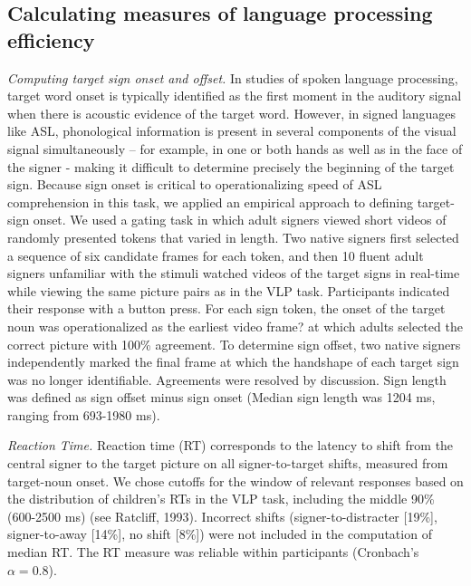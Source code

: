 \documentclass[oneside]{report}
\begin{document}
\subsection{Calculating measures of language processing
efficiency}\label{calculating-measures-of-language-processing-efficiency}

\emph{Computing target sign onset and offset.} In studies of spoken
language processing, target word onset is typically identified as the
first moment in the auditory signal when there is acoustic evidence of
the target word. However, in signed languages like ASL, phonological
information is present in several components of the visual signal
simultaneously -- for example, in one or both hands as well as in the
face of the signer - making it difficult to determine precisely the
beginning of the target sign. Because sign onset is critical to
operationalizing speed of ASL comprehension in this task, we applied an
empirical approach to defining target-sign onset. We used a gating task
in which adult signers viewed short videos of randomly presented tokens
that varied in length. Two native signers first selected a sequence of
six candidate frames for each token, and then 10 fluent adult signers
unfamiliar with the stimuli watched videos of the target signs in
real-time while viewing the same picture pairs as in the VLP task.
Participants indicated their response with a button press. For each sign
token, the onset of the target noun was operationalized as the earliest
video frame? at which adults selected the correct picture with 100\%
agreement. To determine sign offset, two native signers independently
marked the final frame at which the handshape of each target sign was no
longer identifiable. Agreements were resolved by discussion. Sign length
was defined as sign offset minus sign onset (Median sign length was 1204
ms, ranging from 693-1980 ms).

\emph{Reaction Time.} Reaction time (RT) corresponds to the latency to
shift from the central signer to the target picture on all
signer-to-target shifts, measured from target-noun onset. We chose
cutoffs for the window of relevant responses based on the distribution
of children's RTs in the VLP task, including the middle 90\% (600-2500
ms) (see Ratcliff, 1993). Incorrect shifts (signer-to-distracter
{[}19\%{]}, signer-to-away {[}14\%{]}, no shift {[}8\%{]}) were not
included in the computation of median RT. The RT measure was reliable
within participants (Cronbach's \(\alpha = 0.8\)).
\end{document}
